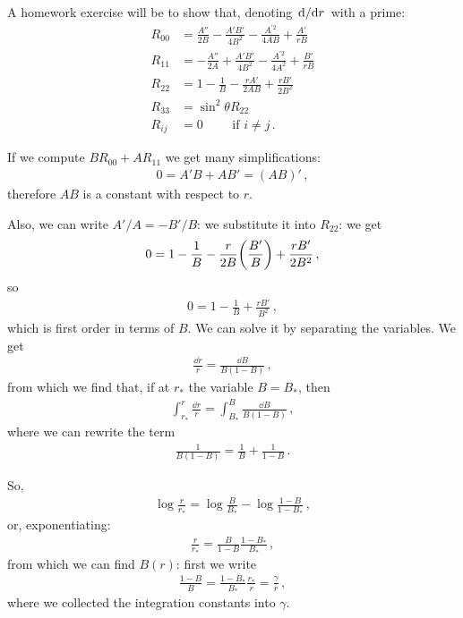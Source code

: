 \documentclass[main.tex]{subfiles}
\begin{document}
A homework exercise will be to show that, denoting \(\dv*{}{r}\) with a prime: 
%
\begin{subequations}
\begin{align}
    R_{00} &= \frac{A''}{2B} - \frac{A' B'}{4B^2} - \frac{A^{\prime 2}}{4AB} + \frac{A'}{rB}  \\
    R_{11} &= -\frac{A''}{2A} + \frac{A' B'}{4B^2} - \frac{A^{\prime 2}}{4A^2} + \frac{B'}{rB} \\
    R_{22} &= 1 - \frac{1}{B} - \frac{r A' }{2 AB} + \frac{rB'}{2 B^2}  \\
    R_{33} &= \sin^2 \theta  R_{22} \\
    R_{ij} &= 0 \qquad \text{ if } i \neq j
\,.
\end{align}
\end{subequations}

If we compute \(BR_{00} + A R_{11}\) we get many simplifications:
%
\begin{align}
  0 = A'B + AB' = (AB)'
\,,
\end{align}
%
therefore \(AB\) is a constant with respect to \(r\).

Also, we can write \(A' / A = - B' / B\): we substitute it into \(R_{22}\): we get 
%
\begin{align}
  0= 1 - \frac{1}{B} - \frac{r}{2B} \qty(\frac{B'}{B}) + \frac{rB'}{2B^2}
\,,
\end{align}
%
so 
%
\begin{align}
  0 = 1 - \frac{1}{B} + \frac{rB'}{B^2}
\,,
\end{align}
%
which is first order in terms of \(B\). We can solve it by separating the variables.
We get 
%
\begin{align}
  \frac{\dd{r}}{r} = \frac{ \dd{B}}{B(1-B)}
\,,
\end{align}
%
from which we find that, if at \(r_{*}\) the variable \(B = B_{*}\), then 
%
\begin{align}
    \int _{r_{*}}^{r}\frac{\dd{r}}{r} = 
    \int _{B_{*}}^{B}  \frac{ \dd{B}}{B(1-B)}
\,,
\end{align}
%
where we can rewrite the term 
%
\begin{align}
  \frac{1}{B(1-B)} = \frac{1}{B} + \frac{1}{1-B}
\,.
\end{align}

So, 
%
\begin{align}
  \log \frac{r}{r_{*}} = \log \frac{B}{B_{*}} - \log \frac{1-B}{1-B_{*}}
\,,
\end{align}
%
or, exponentiating: 
%
\begin{align}
  \frac{r}{r_{*}} = \frac{B}{1-B} \frac{1-B_{*}}{B_{*}}
\,,
\end{align}
%
from which we can find \(B(r)\): first we write 
%
\begin{align}
  \frac{1-B}{B} = \frac{1-B_{*}}{B_{*}} \frac{r_{*}}{r} = \frac{\gamma }{r}
\,,
\end{align}
%
where we collected the integration constants into \(\gamma \).
\end{document}
